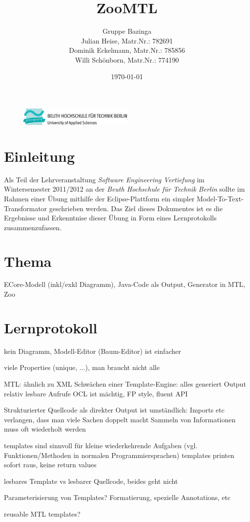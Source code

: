 \documentclass[a4paper]{article}
\title{ZooMTL}
\author{Gruppe Bazinga \\ Julian Heise, Matr.Nr.: 782691 \\ Dominik Eckelmann, Matr.Nr.: 785856 \\ Willi Schönborn, Matr.Nr.: 774190}
\date{\today}
\begin{document}
\begin{figure}[H]
\centering
\includegraphics[width=0.5\textwidth]{beuth.eps}
\maketitle
\end{figure}

\tableofcontents

\newpage

\section{Einleitung}
Als Teil der Lehrveranstaltung \textit{Software Engineering Vertiefung} im Wintersemester 2011/2012 an der \textit{Beuth Hochschule für Technik Berlin} sollte im Rahmen einer Übung mithilfe der Eclipse-Plattform ein simpler Model-To-Text-Transformator geschrieben werden. Das Ziel dieses Dokumentes ist es die Ergebnisse und Erkenntnise dieser Übung in Form eines Lernprotokolls zusammenzufassen.

\section{Thema}
ECore-Modell (inkl/exkl Diagramm), Java-Code als Output, Generator in MTL, Zoo

\section{Lernprotokoll}
kein Diagramm, Modell-Editor (Baum-Editor) ist einfacher

viele Properties (unique, ...), man braucht nicht alle

MTL: ähnlich zu XML
Schwächen einer Template-Engine: alles generiert Output
relativ lesbare Aufrufe
OCL ist mächtig, FP style, fluent API

Strukturierter Quellcode als direkter Output ist umständlich: Imports etc verlangen, dass man viele Sachen doppelt macht
Sammeln von Informationen muss oft wiederholt werden

templates sind sinnvoll für kleine wiederkehrende Aufgaben (vgl. Funktionen/Methoden in normalen Programmiersprachen)
templates printen sofort raus, keine return values

lesbares Template vs lesbarer Quellcode, beides geht nicht

Parameterisierung von Templates? Formatierung, spezielle Annotations, etc

reusable MTL templates?

\printbibliography

\listoffigures

\renewcommand\listoflistingscaption{Quellcodeverzeichnis}
\listoflistings
\end{document}
